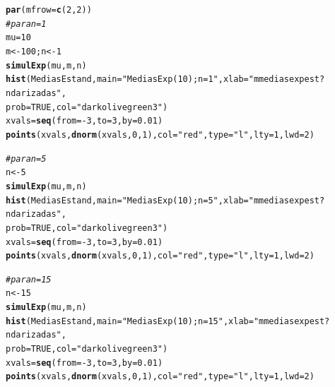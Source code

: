 \documentclass[10pt,a4paper]{article}\usepackage[]{graphicx}\usepackage[]{color}
\makeatletter
\newcommand{\hlnum}[1]{\textcolor[rgb]{0.686,0.059,0.569}{#1}}%
\newcommand{\hlstr}[1]{\textcolor[rgb]{0.192,0.494,0.8}{#1}}%
\newcommand{\hlcom}[1]{\textcolor[rgb]{0.678,0.584,0.686}{\textit{#1}}}%
\newcommand{\hlopt}[1]{\textcolor[rgb]{0,0,0}{#1}}%
\newcommand{\hlstd}[1]{\textcolor[rgb]{0.345,0.345,0.345}{#1}}%
\newcommand{\hlkwb}[1]{\textcolor[rgb]{0.69,0.353,0.396}{#1}}%
\newcommand{\hlkwc}[1]{\textcolor[rgb]{0.333,0.667,0.333}{#1}}%
\newcommand{\hlkwd}[1]{\textcolor[rgb]{0.737,0.353,0.396}{\textbf{#1}}}%
\newenvironment{kframe}{%
 \def\at@end@of@kframe{}%
 \ifinner\ifhmode%
  \def\at@end@of@kframe{\end{minipage}}%
  \begin{minipage}{\columnwidth}%
 \fi\fi%
 \def\FrameCommand##1{\hskip\@totalleftmargin \hskip-\fboxsep
 \colorbox{shadecolor}{##1}\hskip-\fboxsep
     \hskip-\linewidth \hskip-\@totalleftmargin \hskip\columnwidth}%
 \MakeFramed {\advance\hsize-\width
   \@totalleftmargin\z@ \linewidth\hsize
   \@setminipage}}%
 {\par\unskip\endMakeFramed%
 \at@end@of@kframe}
\newenvironment{knitrout}{}{} %
\makeatother
\begin{document}
\begin{knitrout}
\begin{kframe}
\begin{alltt}
\hlkwd{par}\hlstd{(}\hlkwc{mfrow}\hlstd{=}\hlkwd{c}\hlstd{(}\hlnum{2}\hlstd{,}\hlnum{2}\hlstd{))}
\hlcom{# para n=1 }
\hlstd{mu}\hlkwb{=}\hlnum{10}
\hlstd{m} \hlkwb{<-} \hlnum{100}\hlstd{; n} \hlkwb{<-} \hlnum{1}
\hlkwd{simulExp}\hlstd{(mu, m, n)}
\hlkwd{hist}\hlstd{(MediasEstand,} \hlkwc{main}\hlstd{=}\hlstr{"Medias Exp(10); n=1"}\hlstd{,} \hlkwc{xlab}\hlstd{=}\hlstr{"m medias exp est?ndarizadas"}\hlstd{,}
\hlkwc{prob}\hlstd{=}\hlnum{TRUE}\hlstd{,} \hlkwc{col}\hlstd{=}\hlstr{"darkolivegreen3"}\hlstd{)}
\hlstd{xvals} \hlkwb{=} \hlkwd{seq}\hlstd{(}\hlkwc{from}\hlstd{=}\hlopt{-}\hlnum{3}\hlstd{,} \hlkwc{to}\hlstd{=}\hlnum{3}\hlstd{,} \hlkwc{by}\hlstd{=}\hlnum{0.01}\hlstd{)}
\hlkwd{points}\hlstd{(xvals,} \hlkwd{dnorm}\hlstd{(xvals,} \hlnum{0}\hlstd{,} \hlnum{1}\hlstd{),} \hlkwc{col} \hlstd{=} \hlstr{"red"}\hlstd{,} \hlkwc{type}\hlstd{=}\hlstr{"l"}\hlstd{,} \hlkwc{lty}\hlstd{=}\hlnum{1}\hlstd{,} \hlkwc{lwd}\hlstd{=}\hlnum{2}\hlstd{)}

\hlcom{# para n=5 }
\hlstd{n} \hlkwb{<-} \hlnum{5}
\hlkwd{simulExp}\hlstd{(mu, m, n)}
\hlkwd{hist}\hlstd{(MediasEstand,} \hlkwc{main}\hlstd{=}\hlstr{"Medias Exp(10); n=5"}\hlstd{,} \hlkwc{xlab}\hlstd{=}\hlstr{"m medias exp est?ndarizadas"}\hlstd{,}
\hlkwc{prob}\hlstd{=}\hlnum{TRUE}\hlstd{,} \hlkwc{col}\hlstd{=}\hlstr{"darkolivegreen3"}\hlstd{)}
\hlstd{xvals} \hlkwb{=} \hlkwd{seq}\hlstd{(}\hlkwc{from}\hlstd{=}\hlopt{-}\hlnum{3}\hlstd{,} \hlkwc{to}\hlstd{=}\hlnum{3}\hlstd{,} \hlkwc{by}\hlstd{=}\hlnum{0.01}\hlstd{)}
\hlkwd{points}\hlstd{(xvals,} \hlkwd{dnorm}\hlstd{(xvals,} \hlnum{0}\hlstd{,} \hlnum{1}\hlstd{),} \hlkwc{col} \hlstd{=} \hlstr{"red"}\hlstd{,} \hlkwc{type}\hlstd{=}\hlstr{"l"}\hlstd{,} \hlkwc{lty}\hlstd{=}\hlnum{1}\hlstd{,} \hlkwc{lwd}\hlstd{=}\hlnum{2}\hlstd{)}

\hlcom{# para n=15 }
\hlstd{n} \hlkwb{<-} \hlnum{15}
\hlkwd{simulExp}\hlstd{(mu, m, n)}
\hlkwd{hist}\hlstd{(MediasEstand,} \hlkwc{main}\hlstd{=}\hlstr{"Medias Exp(10); n=15"}\hlstd{,} \hlkwc{xlab}\hlstd{=}\hlstr{"m medias exp est?ndarizadas"}\hlstd{,}
     \hlkwc{prob}\hlstd{=}\hlnum{TRUE}\hlstd{,} \hlkwc{col}\hlstd{=}\hlstr{"darkolivegreen3"}\hlstd{)}
\hlstd{xvals} \hlkwb{=} \hlkwd{seq}\hlstd{(}\hlkwc{from}\hlstd{=}\hlopt{-}\hlnum{3}\hlstd{,} \hlkwc{to}\hlstd{=}\hlnum{3}\hlstd{,} \hlkwc{by}\hlstd{=}\hlnum{0.01}\hlstd{)}
\hlkwd{points}\hlstd{(xvals,} \hlkwd{dnorm}\hlstd{(xvals,} \hlnum{0}\hlstd{,} \hlnum{1}\hlstd{),} \hlkwc{col} \hlstd{=} \hlstr{"red"}\hlstd{,} \hlkwc{type}\hlstd{=}\hlstr{"l"}\hlstd{,} \hlkwc{lty}\hlstd{=}\hlnum{1}\hlstd{,} \hlkwc{lwd}\hlstd{=}\hlnum{2}\hlstd{)}


\end{alltt}
\end{kframe}
\end{knitrout}
\end{document}

